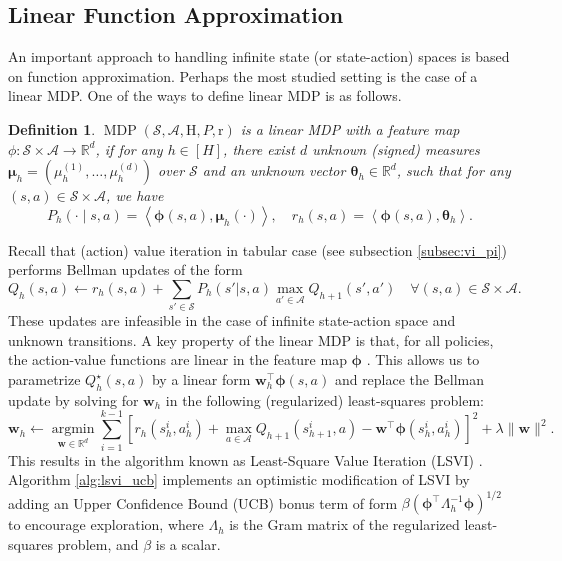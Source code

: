 \documentclass{article}
\numberwithin{equation}{section}
\newtheorem{definition}{Definition}
\newcommand{\cA}{\mathcal{A}}
\newcommand{\cS}{\mathcal{S}}
\begin{document}
\subsection{Linear Function Approximation}\label{s7.1}
An important approach to handling infinite state (or state-action) spaces is based on function approximation. Perhaps the most studied setting is the case of a linear MDP. One of the ways to define linear MDP \citep{jin2020provably} is as follows.
\begin{definition}
    $\operatorname{MDP}(\mathcal{S}, \mathcal{A}, \mathrm{H}, P, \mathrm{r})$ is a linear MDP with a feature map $\phi: \mathcal{S} \times \mathcal{A} \rightarrow \mathbb{R}^d$, if for any $h \in[H]$, there exist $d$ unknown (signed) measures $\boldsymbol{\mu}_h=\left(\mu_h^{(1)}, \ldots, \mu_h^{(d)}\right)$ over $\mathcal{S}$ and an unknown vector $\boldsymbol{\theta}_h \in \mathbb{R}^d$, such that for any $(s, a) \in \mathcal{S} \times \mathcal{A}$, we have
    $$
    P_h(\cdot \mid s, a)=\left\langle\boldsymbol{\phi}(s, a), \boldsymbol{\mu}_h(\cdot)\right\rangle, \quad r_h(s, a)=\left\langle\boldsymbol{\phi}(s, a), \boldsymbol{\theta}_h\right\rangle .
    $$
\end{definition}
Recall that (action) value iteration in tabular case (see subsection \ref{subsec:vi_pi}) performs Bellman updates of the form
\[
    Q_h(s, a) \leftarrow r_h(s,a) + \sum_{s'\in\cS}P_h(s'|s,a) \max_{a'\in\cA} Q_{h+1}(s', a')\quad \forall (s,a) \in \cS \times \cA.
\]
These updates are infeasible in the case of infinite state-action space and unknown transitions. 
A key property of the linear MDP is that, for all policies, the action-value functions are linear in the feature map $\boldsymbol{\phi}$ \citep{jin2020provably}. This allows us to parametrize $Q_h^{\star}(s, a)$ by a linear form $\mathbf{w}_h^{\top} \boldsymbol{\phi}(s, a)$ and replace the Bellman update by solving for $\mathbf{w}_h$ in the following (regularized) least-squares problem:
$$
\mathbf{w}_h \leftarrow \underset{\mathbf{w} \in \mathbb{R}^d}{\operatorname{argmin}} \sum_{i=1}^{k-1}\left[r_h\left(s_h^i, a_h^i\right)+\max _{a \in \mathcal{A}} Q_{h+1}\left(s_{h+1}^i, a\right)-\mathbf{w}^{\top} \boldsymbol{\phi}\left(s_h^i, a_h^i\right)\right]^2+\lambda\|\mathbf{w}\|^2 .
$$
This results in the algorithm known as Least-Square Value Iteration (LSVI) \citep{bradtke1996linear,osband2016generalization}.
Algorithm \ref{alg:lsvi_ucb} implements an optimistic modification of LSVI by adding an Upper Confidence Bound (UCB) bonus term of form $\beta\left(\boldsymbol{\phi}^{\top} \Lambda_h^{-1} \boldsymbol{\phi}\right)^{1 / 2}$ to encourage exploration, where $\Lambda_h$ is the Gram matrix of the regularized least-squares problem, and $\beta$ is a scalar.
\end{document}

